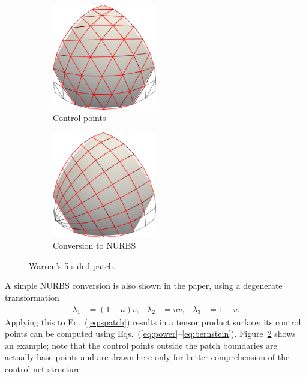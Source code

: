 \documentclass[9pt,academicons]{article}
\begin{document}
\begin{figure}
  \begin{subfigure}{0.49\textwidth}
    \centering
    \includegraphics[width = 0.5\textwidth]{images/warren-cnet.png}
    \caption{Control points}
    \label{fig:warren-cnet}
  \end{subfigure}
  \hfill
  \begin{subfigure}{0.49\textwidth}
    \centering
    \includegraphics[width = 0.5\textwidth]{images/warren-quad.png}
    \caption{Conversion to NURBS}
    \label{fig:warren-quad}
  \end{subfigure}
  \caption{Warren's 5-sided patch.}
  \label{fig:warren}
\end{figure}
A simple NURBS conversion is also shown in the paper,
using a degenerate transformation
\begin{align}
  \lambda_1&=(1-u)v, & \lambda_2&=uv, & \lambda_3&=1-v.
\end{align}
Applying this to Eq.~(\ref{eq:spatch}) results in a tensor product surface; its control points
can be computed using Eqs.~(\ref{eq:power}--\ref{eq:bernstein}).
Figure~\ref{fig:warren-quad} shows an example; note that the control points outside the
patch boundaries are actually base points and are drawn here only for better comprehension
of the control net structure.
\end{document}
